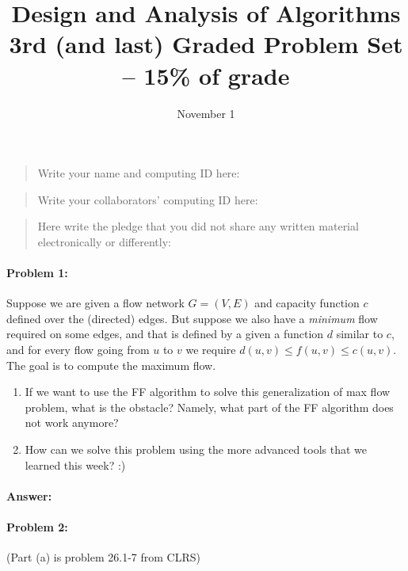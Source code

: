 \documentclass{article}
\title{Design and Analysis of Algorithms\\ {\bf 3rd (and last) Graded Problem Set -- 15\% of grade}}
\author{}
\date{November 1}
\begin{document}
\maketitle

\begin{quote}
    Write your name and computing ID here:
\end{quote}

\vspace{20px}

\begin{quote}
    Write your collaborators' computing ID here:
\end{quote}

\vspace{20px}

\begin{quote}
    Here write the pledge that you did not share any written material electronically or differently:
\end{quote}

\newpage
\paragraph{Problem 1:} Suppose we are given a flow network $G=(V,E)$ and capacity function $c$ defined over the (directed) edges. But suppose we also have a \emph{minimum} flow required on some edges, and that is defined by a given a function $d$ similar to $c$, and for every flow going from $u$ to $v$ we require $d(u,v) \leq f(u,v) \leq c(u,v)$. The goal is to compute the maximum flow.

\begin{enumerate}[label=\alph*]
\item If we want to use the FF algorithm to solve this generalization of max flow problem, what is the obstacle? Namely, what part of the FF algorithm does not work anymore?
\item How can we solve this problem using the more advanced tools that we learned this week? :)
\end{enumerate}
\paragraph{Answer:}


\newpage
\paragraph{Problem 2:} (Part (a) is problem 26.1-7 from CLRS)
\end{document}
